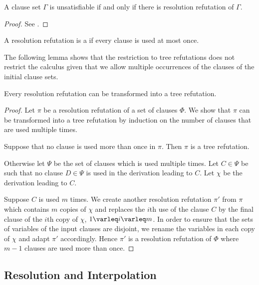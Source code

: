 \begin{samepage}
	\begin{thm}
		A clause set $\Gamma$ is unsatisfiable if and only if there is resolution refutation of $\Gamma$.
	\end{thm}
	\begin{proof}
		See \cite{Rob65}.
	\end{proof}
\end{samepage}



\begin{defi}
	A resolution refutation is a  if every clause is used at most once.
\end{defi}

The following lemma shows that the restriction to tree refutations does not restrict the calculus given that we allow multiple occurrences of the clauses of the initial clause sets.

\begin{lemma}
	\label{lemma:bin_tree_deduction}
	Every resolution refutation can be transformed into a tree refutation.
\end{lemma}
\begin{proof}
	Let $\pi$ be a resolution refutation of a set of clauses $\Phi$.
	We show that $\pi$ can be transformed into a tree refutation by induction on the number of clauses that are used multiple times.

	Suppose that no clause is used more than once in $\pi$. Then $\pi$ is a tree refutation.

	Otherwise let $\Psi$ be the set of clauses which is used multiple times.
	Let $C \in \Psi$ be such that no clause $D \in \Psi$ is used in the derivation leading to $C$.
	Let $\chi$ be the derivation leading to $C$.

	Suppose $C$ is used $m$ times.
	We create another resolution refutation $\pi'$ from $\pi$ which contains $m$ copies of $\chi$ and replaces the $i$th use of the clause $C$ by the final clause of the $i$th copy of $\chi$, $1 \varleq i \varleq m$.
	In order to ensure that the sets of variables of the input clauses are disjoint, we rename the variables in each copy of $\chi$ and adapt $\pi'$ accordingly.
	Hence $\pi'$ is a resolution refutation of $\Phi$ where $m-1$ clauses are used more than once.
\end{proof}


\subsection{Resolution and Interpolation}
\label{sec:resolution_and_interpolation}


